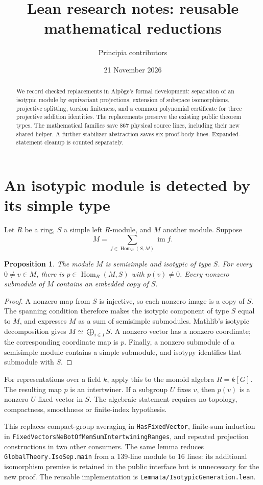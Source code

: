 \documentclass[11pt]{article}
\title{Lean research notes: reusable mathematical reductions}
\author{Principia contributors}
\date{21 November 2026}
\newtheorem{proposition}{Proposition}
\newcommand{\HomR}{\operatorname{Hom}_R}
\newcommand{\src}[1]{\nolinkurl{#1}}
\begin{document}
\maketitle
\begin{abstract}
We record checked replacements in Alp\"oge's formal development: separation
of an isotypic module by equivariant projections, extension of subspace
isomorphisms, projective splitting, torsion finiteness, and a common
polynomial certificate for three projective addition identities.
The replacements preserve the existing public theorem types.
The mathematical families save 867 physical source lines, including their
new shared helper. A further stabilizer abstraction saves six proof-body
lines. Expanded-statement cleanup is counted separately.
\end{abstract}

\section{An isotypic module is detected by its simple type}
Let $R$ be a ring, $S$ a simple left $R$-module, and $M$ another module.
Suppose
\[
 M=\sum_{f\in\HomR(S,M)}\operatorname{im} f.
\]
\begin{proposition}
The module $M$ is semisimple and isotypic of type $S$. For every
$0\ne v\in M$, there is $p\in\HomR(M,S)$ with $p(v)\ne0$.
Every nonzero submodule of $M$ contains an embedded copy of $S$.
\end{proposition}
\begin{proof}
A nonzero map from $S$ is injective, so each nonzero image is a copy of $S$.
The spanning condition therefore makes the isotypic component of type $S$
equal to $M$, and expresses $M$ as a sum of semisimple submodules.
Mathlib's isotypic decomposition gives
$M\simeq\bigoplus_{i\in I} S$. A nonzero vector has a nonzero coordinate;
the corresponding coordinate map is $p$. Finally, a nonzero submodule of a
semisimple module contains a simple submodule, and isotypy identifies that
submodule with $S$.
\end{proof}

For representations over a field $k$, apply this to the monoid algebra
$R=k[G]$. The resulting map $p$ is an intertwiner. If a subgroup $U$
fixes $v$, then $p(v)$ is a nonzero $U$-fixed vector in $S$.
The algebraic statement requires no topology, compactness, smoothness or
finite-index hypothesis.

This replaces compact-group averaging in \src{HasFixedVector}, finite-sum
induction in \src{FixedVectorsNeBotOfMemSumIntertwiningRanges}, and repeated
projection constructions in two other consumers. The same lemma reduces
\src{GlobalTheory.IsoSep.main} from a 139-line module to 16 lines: its
additional isomorphism premise is retained in the public interface but is
unnecessary for the new proof. The reusable implementation is
\src{Lemmata/IsotypicGeneration.lean}.
\end{document}
